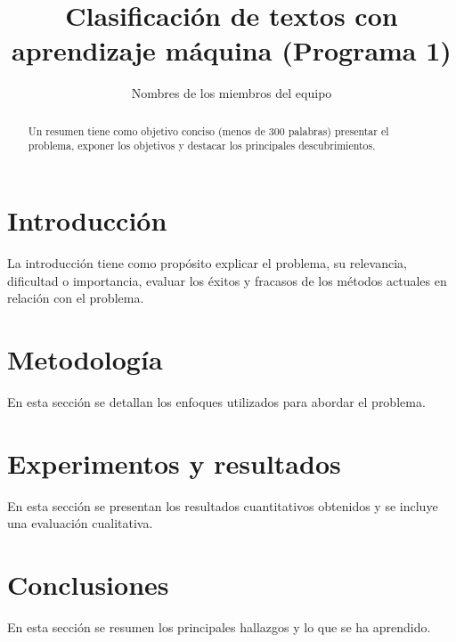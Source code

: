 \documentclass{article}
\title{Clasificación de textos con aprendizaje máquina (Programa 1)}
\author{Nombres de los miembros del equipo}
\affil{UNAM, FI Procesamiento del Lenguaje Natural 2025-2}
\begin{document}
\maketitle

\begin{abstract}
Un resumen tiene como objetivo conciso (menos de 300 palabras) presentar el problema, exponer los objetivos y destacar los principales descubrimientos.
\end{abstract}

\section{Introducción}
La introducción tiene como propósito explicar el problema, su relevancia, dificultad o importancia, evaluar los éxitos y fracasos de los métodos actuales en relación con el problema.


\section{Metodología}
En esta sección se detallan los enfoques utilizados para abordar el problema. 

\section{Experimentos y resultados}
En esta sección se presentan los resultados cuantitativos obtenidos y se incluye una evaluación cualitativa.

\section{Conclusiones}
En esta sección se resumen los principales hallazgos y lo que se ha aprendido. 






 
\end{document}
